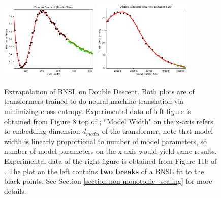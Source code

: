 \documentclass{article} %
\begin{document}

\FloatBarrier
\begin{figure}[h]%
    \centering


\includegraphics[width=0.42\textwidth]{figures/double_descent/double_descent__model_size.png}
\includegraphics[width=0.42\textwidth]{figures/double_descent/double_descent__dataset_size_1.png}

    \caption{
    Extrapolation of BNSL on Double Descent. Both plots are of transformers trained to do neural machine translation via minimizing cross-entropy. Experimental data of left figure is obtained from Figure 8 top of \cite{nakkiran2021deep}; ``Model Width" on the x-axis refers to embedding dimension $d_{model}$ of the transformer; note that model width is linearly proportional to number of model parameters, so number of model parameters on the x-axis would yield same results. Experimental data of the right figure is obtained from Figure 11b of \cite{nakkiran2021deep}. The plot on the left contains \textbf{two breaks} of a BNSL fit to the black points. See Section \ref{section:non-monotonic_scaling} for more details.
    }
    \label{fig:double_descent}
\end{figure}

\vspace{-2.5mm}

\FloatBarrier
\end{document}
